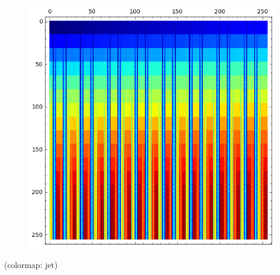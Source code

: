 \documentclass[pdf,sprung,slideColor,nocolorBG]{beamer}
\newenvironment{colortheme}[1]{
\def\ProvidesPackageRCS $##1${\relax}
\renewcommand{\ProcessOptions}{\relax}
\makeatletter

\makeatother
}{}
\newcommand{\slidecite}[1]{\tiny{(#1)}\normalsize{}}
\begin{document}
\begin{colortheme}{jubata}
\begin{frame}
\begin{figure}
\begin{minipage}{.48\textwidth}
\includegraphics[width=.9\linewidth]{../matrix_plot/cast128_6_17_bent_cayley_graph_index_matrix.png}
  \label{fig:cast128_6_17_bent_cayley_graph_index_matrix}
\end{minipage}%
\end{figure}
\slidecite{colormap: jet}
\end{frame}


\end{colortheme}
\end{document}
